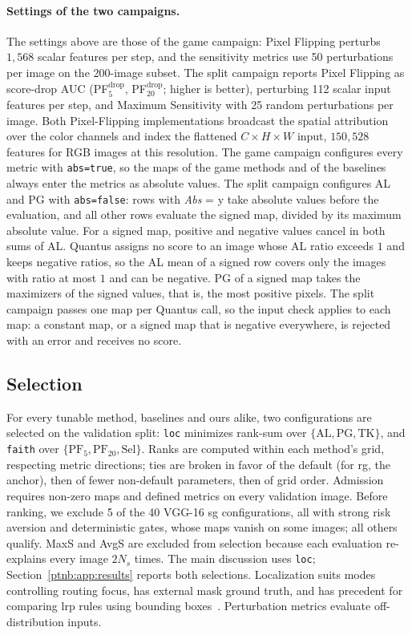\paragraph{Settings of the two campaigns.}
The settings above are those of the game campaign: Pixel Flipping perturbs $1{,}568$ scalar features per step, and the sensitivity metrics use 50 perturbations per image on the 200-image subset. The split campaign reports Pixel Flipping as score-drop AUC (PF$^{\mathrm{drop}}_5$, PF$^{\mathrm{drop}}_{20}$; higher is better), perturbing 112 scalar input features per step, and Maximum Sensitivity with 25 random perturbations per image. Both Pixel-Flipping implementations broadcast the spatial attribution over the color channels and index the flattened $C\times H\times W$ input, $150{,}528$ features for RGB images at this resolution. The game campaign configures every metric with \texttt{abs=true}, so the maps of the game methods and of the baselines always enter the metrics as absolute values. The split campaign configures AL and PG with \texttt{abs=false}: rows with \emph{Abs} = y take absolute values before the evaluation, and all other rows evaluate the signed map, divided by its maximum absolute value. For a signed map, positive and negative values cancel in both sums of AL. Quantus assigns no score to an image whose AL ratio exceeds $1$ and keeps negative ratios, so the AL mean of a signed row covers only the images with ratio at most $1$ and can be negative. PG of a signed map takes the maximizers of the signed values, that is, the most positive pixels. The split campaign passes one map per Quantus call, so the input check applies to each map: a constant map, or a signed map that is negative everywhere, is rejected with an error and receives no score.

\subsection{Selection}\label{ptnb:app:selection}

For every tunable method, baselines and ours alike, two configurations are selected on the validation split: \texttt{loc} minimizes rank-sum over $\{\text{AL}, \text{PG}, \text{TK}\}$, and \texttt{faith} over $\{\text{PF}_5, \text{PF}_{20}, \text{Sel}\}$. Ranks are computed within each method's grid, respecting metric directions; ties are broken in favor of the default (for \ac{rg}, the anchor), then of fewer non-default parameters, then of grid order. Admission requires non-zero maps and defined metrics on every validation image. Before ranking, we exclude 5 of the 40 VGG-16 \ac{sg} configurations, all with strong risk aversion and deterministic gates, whose maps vanish on some images; all others qualify. MaxS and AvgS are excluded from selection because each evaluation re-explains every image $2N_s$ times. The main discussion uses \texttt{loc}; Section~\ref{ptnb:app:results} reports both selections. Localization suits modes controlling routing focus, has external mask ground truth, and has precedent for comparing \ac{lrp} rules using bounding boxes~\parencite{Kohlbrenner2020}. Perturbation metrics evaluate off-distribution inputs.

